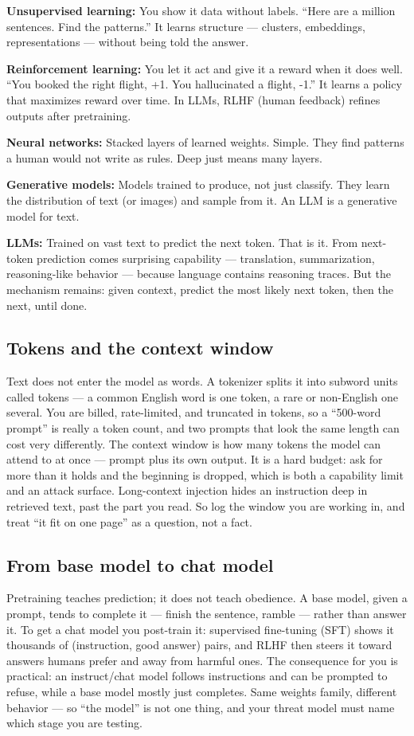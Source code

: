\textbf{Unsupervised learning:} You show it data without labels. ``Here are a million sentences. Find the patterns.'' It learns structure — clusters, embeddings, representations — without being told the answer.

\textbf{Reinforcement learning:} You let it act and give it a reward when it does well. ``You booked the right flight, +1. You hallucinated a flight, -1.'' It learns a policy that maximizes reward over time. In LLMs, RLHF (human feedback) refines outputs after pretraining.

\textbf{Neural networks:} Stacked layers of learned weights. Simple. They find patterns a human would not write as rules. Deep just means many layers.

\textbf{Generative models:} Models trained to produce, not just classify. They learn the distribution of text (or images) and sample from it. An LLM is a generative model for text.

\textbf{LLMs:} Trained on vast text to predict the next token. That is it. From next-token prediction comes surprising capability — translation, summarization, reasoning-like behavior — because language contains reasoning traces. But the mechanism remains: given context, predict the most likely next token, then the next, until done.

\subsection{Tokens and the context window}
Text does not enter the model as words. A tokenizer splits it into subword units called tokens — a common English word is one token, a rare or non-English one several. You are billed, rate-limited, and truncated in tokens, so a ``500-word prompt'' is really a token count, and two prompts that look the same length can cost very differently. The context window is how many tokens the model can attend to at once — prompt plus its own output. It is a hard budget: ask for more than it holds and the beginning is dropped, which is both a capability limit and an attack surface. Long-context injection hides an instruction deep in retrieved text, past the part you read. So log the window you are working in, and treat ``it fit on one page'' as a question, not a fact.

\subsection{From base model to chat model}
Pretraining teaches prediction; it does not teach obedience. A base model, given a prompt, tends to complete it — finish the sentence, ramble — rather than answer it. To get a chat model you post-train it: supervised fine-tuning (SFT) shows it thousands of (instruction, good answer) pairs, and RLHF then steers it toward answers humans prefer and away from harmful ones. The consequence for you is practical: an instruct/chat model follows instructions and can be prompted to refuse, while a base model mostly just completes. Same weights family, different behavior — so ``the model'' is not one thing, and your threat model must name which stage you are testing.

